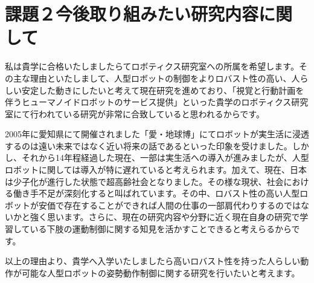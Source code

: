 \documentclass[a4paper,twocolumn]{jsarticle}
\begin{document}
    \section{課題２今後取り組みたい研究内容に関して}
    私は貴学に合格いたしましたらてロボティクス研究室への所属を希望します。その主な理由といたしまして、人型ロボットの制御をよりロバスト性の高い、人らしい安定した動きにしたいと考えて現在研究を進めており、「視覚と行動計画を伴うヒューマノイドロボットのサービス提供」といった貴学のロボティクス研究室にて行われている研究が非常に合致していると思われるからです。

    2005年に愛知県にて開催されました「愛・地球博」にてロボットが実生活に浸透するのは遠い未来ではなく近い将来の話であるといった印象を受けました。しかし、それから14年程経過した現在、一部は実生活への導入が進みましたが、人型ロボットに関しては導入が特に遅れていると考えられます。加えて、現在、日本は少子化が進行した状態で超高齢社会となりました。その様な現状、社会における働き手不足が深刻化すると叫ばれています。その中、ロバスト性の高い人型ロボットが安価で存在することができれば人間の仕事の一部肩代わりするのではないかと強く思います。さらに、現在の研究内容や分野に近く現在自身の研究で学習している下肢の運動制御に関する知見を活かすことできると考えらるからです。

    以上の理由より、貴学へ入学いたしましたら高いロバスト性を持った人らしい動作が可能な人型ロボットの姿勢動作制御に関する研究を行いたいと考えます。
\end{document}
